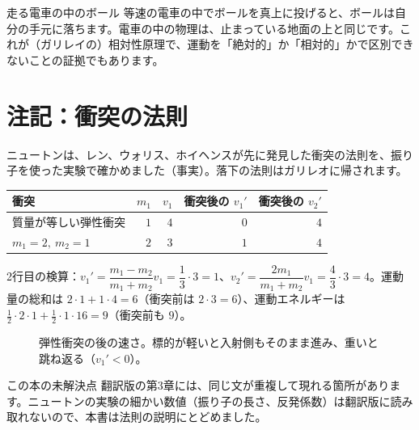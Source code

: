 \documentclass[a4paper,11pt,openany]{ltjsbook}
\begin{document}
\begin{examplebox}{走る電車の中のボール}
等速の電車の中でボールを真上に投げると、ボールは自分の手元に落ちます。電車の中の物理は、止まっている地面の上と同じです。これが（ガリレイの）相対性原理で、運動を「絶対的」か「相対的」かで区別できないことの証拠でもあります。
\end{examplebox}

\section{注記：衝突の法則}

ニュートンは、レン、ウォリス、ホイヘンスが先に発見した衝突の法則を、振り子を使った実験で確かめました（事実）。落下の法則はガリレオに帰されます。

\begin{center}
\begin{tabular}{lrrrr}
\toprule
衝突 & $m_1$ & $v_1$ & 衝突後の $v_1'$ & 衝突後の $v_2'$\\
\midrule
質量が等しい弾性衝突 & $1$ & $4$ & $0$ & $4$\\
$m_1=2,\ m_2=1$ & $2$ & $3$ & $1$ & $4$\\
\bottomrule
\end{tabular}
\end{center}

2行目の検算：$v_1'=\dfrac{m_1-m_2}{m_1+m_2}v_1=\dfrac13\cdot3=1$、$v_2'=\dfrac{2m_1}{m_1+m_2}v_1=\dfrac43\cdot3=4$。運動量の総和は $2\cdot1+1\cdot4=6$（衝突前は $2\cdot3=6$）、運動エネルギーは $\frac12\cdot2\cdot1+\frac12\cdot1\cdot16=9$（衝突前も $9$）。

\begin{figure}[htbp]
\centering
{}
\caption{弾性衝突の後の速さ。標的が軽いと入射側もそのまま進み、重いと跳ね返る（$v_1'<0$）。}
\end{figure}

\begin{notebox}{この本の未解決点}
翻訳版の第3章には、同じ文が重複して現れる箇所があります。ニュートンの実験の細かい数値（振り子の長さ、反発係数）は翻訳版に読み取れないので、本書は法則の説明にとどめました。
\end{notebox}
\end{document}
